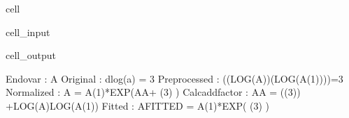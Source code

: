 \documentclass[letterpaper,10pt,english]{jupyterBook}
\begin{document}
\begin{sphinxuseclass}{cell}\begin{sphinxVerbatimInput}

\begin{sphinxuseclass}{cell_input}
\begin{sphinxVerbatim}[commandchars=\\\{\}]
\end{sphinxVerbatim}

\end{sphinxuseclass}\end{sphinxVerbatimInput}
\begin{sphinxVerbatimOutput}

\begin{sphinxuseclass}{cell_output}
\begin{sphinxVerbatim}[commandchars=\\\{\}]
Endo\PYGZus{}var        : A
Original        : dlog(a) = 3 
Preprocessed    : ((LOG(A))\PYGZhy{}(LOG(A(\PYGZhy{}1))))=3
Normalized      : A = A(\PYGZhy{}1)*EXP(A\PYGZus{}A+ (3) )
Calc\PYGZus{}add\PYGZus{}factor : A\PYGZus{}A = \PYGZhy{} ((3)) +LOG(A)\PYGZhy{}LOG(A(\PYGZhy{}1))
Fitted          : A\PYGZus{}FITTED = A(\PYGZhy{}1)*EXP( (3) )
\end{sphinxVerbatim}

\begin{sphinxVerbatim}[commandchars=\\\{\}]

\end{sphinxVerbatim}

\end{sphinxuseclass}\end{sphinxVerbatimOutput}

\end{sphinxuseclass}
\end{document}
